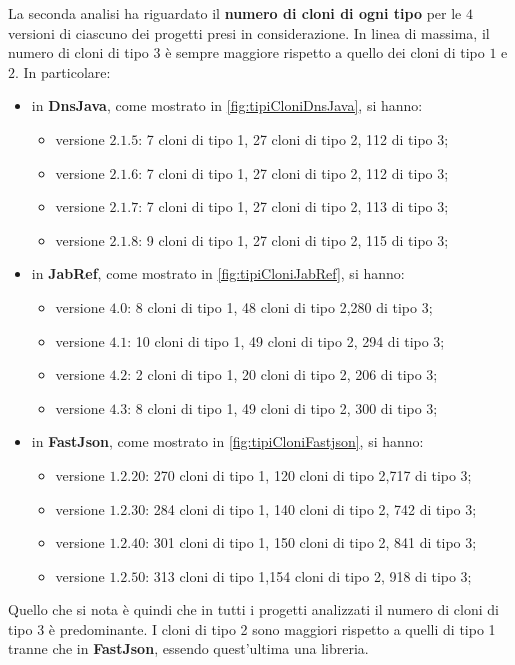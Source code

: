 La seconda analisi ha riguardato il \textbf{numero di cloni di ogni tipo} per le $4$ versioni di ciascuno dei progetti presi in considerazione. In linea di massima, il numero di cloni di tipo $3$ è sempre maggiore rispetto a quello dei cloni di tipo $1$ e $2$. In particolare:
\begin{itemize}
	\item in \textbf{DnsJava}, come mostrato in \autoref{fig:tipiCloniDnsJava}, si hanno:
		\begin{itemize}
				\item versione $2.1.5$: 7 cloni di tipo 1, 27 cloni di tipo 2, 112 di tipo 3;
				\item versione $2.1.6$: 7 cloni di tipo 1, 27 cloni di tipo 2, 112 di tipo 3;
				\item versione $2.1.7$: 7 cloni di tipo 1, 27 cloni di tipo 2, 113 di tipo 3;
				\item versione $2.1.8$: 9 cloni di tipo 1, 27 cloni di tipo 2, 115 di tipo 3;		
		\end{itemize}
	\item in \textbf{JabRef}, come mostrato in \autoref{fig:tipiCloniJabRef}, si hanno:
				\begin{itemize}
			\item versione $4.0$: 8 cloni di tipo 1, 48 cloni di tipo 2,280 di tipo 3;
			\item versione $4.1$: 10 cloni di tipo 1, 49 cloni di tipo 2, 294 di tipo 3;
			\item versione $4.2$: 2 cloni di tipo 1, 20 cloni di tipo 2, 206 di tipo 3;
			\item versione $4.3$: 8 cloni di tipo 1, 49 cloni di tipo 2, 300 di tipo 3;		
		\end{itemize}
	\item in \textbf{FastJson}, come mostrato in \autoref{fig:tipiCloniFastjson}, si hanno:
	\begin{itemize}
		\item versione $1.2.20$: 270 cloni di tipo 1, 120 cloni di tipo 2,717 di tipo 3;
		\item versione $1.2.30$: 284 cloni di tipo 1, 140 cloni di tipo 2, 742 di tipo 3;
		\item versione $1.2.40$: 301 cloni di tipo 1, 150 cloni di tipo 2, 841 di tipo 3;
		\item versione $1.2.50$: 313 cloni di tipo 1,154 cloni di tipo 2, 918 di tipo 3;		
	\end{itemize}
\end{itemize}
Quello che si nota è quindi che in tutti i progetti analizzati il numero di cloni di tipo 3 è predominante. I cloni di tipo 2 sono maggiori rispetto a quelli di tipo 1 tranne che in \textbf{FastJson}, essendo quest'ultima una libreria.
